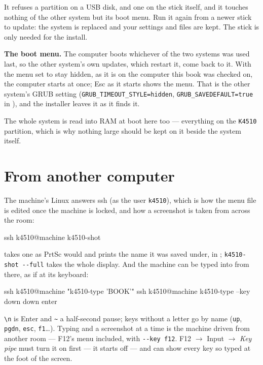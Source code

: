\noindent It refuses a partition on a USB disk, and one on the stick
itself, and it touches nothing of the other system but its boot menu.
Run it again from a newer stick to update: the system is replaced and
your settings and files are kept. The stick is only needed for the
install.

\textbf{The boot menu.} The computer boots whichever of the two systems
was used last, so the other system's own updates, which restart it,
come back to it. With the menu set to stay hidden, as it is on the
computer this book was checked on, the computer starts at once; Esc as
it starts shows the menu. That is the other system's GRUB setting
(\texttt{GRUB\_TIMEOUT\_STYLE=hidden}, \texttt{GRUB\_SAVEDEFAULT=true}
in ), and the installer leaves it as it finds it.

The whole system is read into RAM at boot here too --- everything on the
\texttt{K4510} partition, which is why nothing large should be kept on it
beside the system itself.

\section{From another computer}
The machine's Linux answers ssh (as the user \texttt{k4510}), which is
how the menu file is edited once the machine is locked, and how a
screenshot is taken from across the room:

\begin{type}
ssh k4510@machine k4510-shot
\end{type}

\noindent takes one as PrtSc would and prints the name it was saved
under, in ; \verb|k4510-shot --full| takes the whole display. And the
machine can be typed into from there, as if at its keyboard:

\begin{type}
ssh k4510@machine "k4510-type 'BOOK\n'"
ssh k4510@machine k4510-type --key down down enter
\end{type}

\noindent \verb|\n| is Enter and \verb|~| a half-second pause; keys
without a letter go by name (\verb|up|, \verb|pgdn|, \verb|esc|,
\verb|f1|\ldots). Typing and a screenshot at a time is the machine
driven from another room --- F12's menu included, with
\verb|--key f12|. F12 $\rightarrow$ Input $\rightarrow$ \emph{Key pipe}
must turn it on first --- it starts off --- and can show every key so
typed at the foot of the screen.

